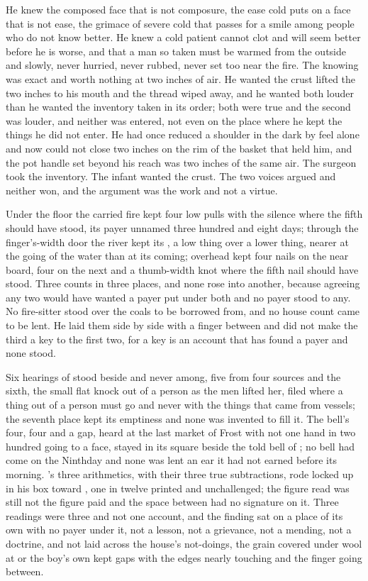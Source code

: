 He knew the composed face that is not composure, the ease cold puts on a face that is not ease, the grimace of severe cold that passes for a smile among people who do not know better. He knew a cold patient cannot clot and will seem better before he is worse, and that a man so taken must be warmed from the outside and slowly, never hurried, never rubbed, never set too near the fire. The knowing was exact and worth nothing at two inches of air. He wanted the crust lifted the two inches to his mouth and the thread wiped away, and he wanted both louder than he wanted the inventory taken in its order; both were true and the second was louder, and neither was entered, not even on the place where he kept the things he did not enter. He had once reduced a shoulder in the dark by feel alone and now could not close two inches on the rim of the basket that held him, and the pot handle set beyond his reach was two inches of the same air. The surgeon took the inventory. The infant wanted the crust. The two voices argued and neither won, and the argument was the work and not a virtue.

Under the floor the carried fire kept four low pulls with the silence where the fifth should have stood, its payer unnamed three hundred and eight days; through the finger's-width door the river kept its , a low thing over a lower thing, nearer at the going of the water than at its coming; overhead  kept four nails on the near board, four on the next and a thumb-width knot where the fifth nail should have stood. Three counts in three places, and none rose into another, because agreeing any two would have wanted a payer put under both and no payer stood to any. No fire-sitter stood over the coals to be borrowed from, and no house count came to be lent. He laid them side by side with a finger between and did not make the third a key to the first two, for a key is an account that has found a payer and none stood.

\scenebreak

Six hearings of  stood beside and never among, five from four sources and the sixth, the small flat knock out of a person as the men lifted her, filed where a thing out of a person must go and never with the things that came from vessels; the seventh place kept its emptiness and none was invented to fill it. The bell's four, four and a gap, heard at the last market of Frost with not one hand in two hundred going to a face, stayed in its square beside the told bell of ; no bell had come on the Ninthday and none was lent an ear it had not earned before its morning. 's three arithmetics, with their three true subtractions, rode locked up  in his box toward , one in twelve printed and unchallenged; the figure read was still not the figure paid and the space between had no signature on it. Three readings were three and not one account, and the finding sat on a place of its own with no payer under it, not a lesson, not a grievance, not a mending, not a doctrine, and not laid across the house's not-doings, the grain covered under wool at  or the boy's own kept gaps with the edges nearly touching and the finger going between.

